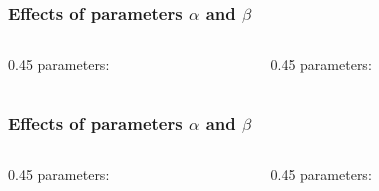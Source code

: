 \documentclass[aspectratio=169]{beamer}
\begin{document}
%
%
%
% 			
%
% 			

\begin{frame}
	\frametitle{Effects of parameters $\alpha$ and $\beta$}


  \vspace{1.5em}

	\begin{columns}
		\begin{column}{0.45\textwidth}
			 parameters:

			
		\end{column}
		\begin{column}{0.45\textwidth}
			 parameters:

			
		\end{column}
	\end{columns}
\end{frame}

\begin{frame}
	\frametitle{Effects of parameters $\alpha$ and $\beta$}


  \vspace{1.5em}

	\begin{columns}
		\begin{column}{0.45\textwidth}
			 parameters:

			
		\end{column}
		\begin{column}{0.45\textwidth}
			 parameters:

			
		\end{column}
	\end{columns}
\end{frame}
\end{document}
